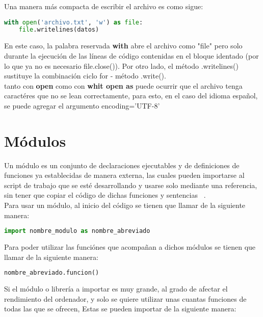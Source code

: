 \documentclass[10pt,oneside]{article}
\begin{document}
\begin{multicols}{2}
            Una manera más compacta de escribir el archivo es como sigue:

            \begin{lstlisting}[language=Python]
with open('archivo.txt', 'w') as file:
    file.writelines(datos)
            \end{lstlisting}

            En este caso, la palabra reservada \textbf{with} abre el archivo como "file" pero solo durante la ejecución de las líneas de código contenidas en el bloque identado (por lo que ya no es necesario file.close()). Por otro lado, el método .writelines() sustituye la combinación ciclo for - método .write().\\ \newline tanto con \textbf{open} como con \textbf{whit open as} puede ocurrir que el archivo tenga caractéres que no se lean correctamente, para esto, en el caso del idioma español, se puede agregar el argumento encoding='UTF-8'

            \section{Módulos}

                Un módulo es un conjunto de declaraciones ejecutables y de definiciones de funciones ya establecidas de manera externa, las cuales pueden importarse al script de trabajo que se esté desarrollando y usarse solo mediante una referencia, sin tener que copiar el código de dichas funciones y sentencias ~\cite{PythonD}.\\ \newline Para usar un módulo, al inicio del código se tienen que llamar de la siguiente manera:
                
                \begin{lstlisting}[language=Python]
import nombre_modulo as nombre_abreviado                    
                \end{lstlisting}
                
                Para poder utilizar las funciónes que acompañan a dichos módulos  se tienen que llamar de la siguiente manera: 
                
                \begin{lstlisting}[language=Python]
nombre_abreviado.funcion()                   
                \end{lstlisting} 

                 Si el módulo o librería a importar es muy grande, al grado de afectar el rendimiento del ordenador, y solo se quiere utilizar unas cuantas funciones de todas las que se ofrecen, Estas se pueden importar  de la siguiente manera:


\end{multicols}
\end{document}
